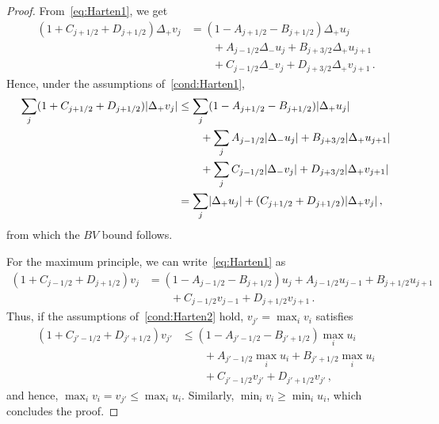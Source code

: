 \documentclass[11pt,leqno]{amsart}
\DeclarePairedDelimiter\abs{\lvert}{\rvert}
\begin{document}
\begin{proof}
From~\eqref{eq:Harten1}, we get
\begin{align*}
  (1+C_{j+1/2}+D_{j+1/2})\Delta_+ v_j&=(1-A_{j+1/2}-B_{j+1/2})\Delta_+u_j\\&\qquad{}+ A_{j-1/2}\Delta_- u_j + B_{j+3/2}\Delta_+u_{j+1}\\&\qquad {}+ C_{j-1/2}\Delta_-v_j + D_{j+3/2}\Delta_+v_{j+1}\,.
\end{align*}
Hence, under the assumptions of~\ref{cond:Harten1},
\begin{align*}
  \sum_j (1+C_{j+1/2}+D_{j+1/2}) \abs{\Delta_+ v_j}&\le \sum_j  (1-A_{j+1/2}-B_{j+1/2})\abs{\Delta_+u_j}  \\&\qquad {}+ \sum_j A_{j-1/2}\abs{\Delta_- u_j}+ B_{j+3/2}\abs{\Delta_+u_{j+1}} \\&\qquad{}+\sum_j C_{j-1/2}\abs{\Delta_-v_j} + D_{j+3/2}\abs{\Delta_+v_{j+1}}\\
&= \sum_j \abs{\Delta_+ u_j} + (C_{j+1/2}+D_{j+1/2})\abs{\Delta_+ v_j}\,,
\end{align*}
from which the $BV$ bound follows.

For the maximum principle, we can write~\eqref{eq:Harten1} as
\begin{align*}
    (1+C_{j-1/2}+D_{j+1/2}) v_j&=(1-A_{j-1/2}-B_{j+1/2}) u_j + A_{j-1/2}u_{j-1} + B_{j+1/2}u_{j+1}\\&\qquad {}+ C_{j-1/2}v_{j-1} + D_{j+1/2}v_{j+1}\,.
\end{align*}
Thus, if the assumptions of~\ref{cond:Harten2} hold, $v_{j'}=\max_i v_i$ satisfies
\begin{align*}
    (1+C_{j'-1/2}+D_{j'+1/2}) v_{j'}&\le (1-A_{j'-1/2}-B_{j'+1/2}) \max_i u_i\\&\qquad{}+ A_{j'-1/2}\max_i u_i + B_{j'+1/2}\max_i u_i\\&\qquad {}+ C_{j'-1/2} v_{j'} + D_{j'+1/2} v_{j'}\,,  
\end{align*}
and hence, $\max_i v_i =v_{j'}\le \max_i u_i$. Similarly, $\min_i v_i \ge \min_i u_i$, which concludes the proof.
\end{proof}
\end{document}
